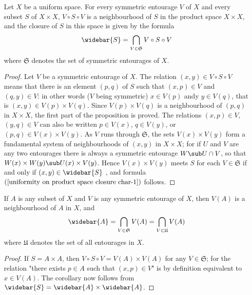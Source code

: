 \begin{proposition}\label{uniformity on product space closure char}
Let $X$ be a uniform space. For every symmetric entourage $V$ of $X$ and every subset $S$ of $X\times X$, $V\circ S\circ V$ is a neighbourhood of $S$ in the product space $X\times X$, and the closure of $S$ in this space is given by the formula
\begin{align}\label{uniformity on product space closure char-1}
\widebar{S}=\bigcap_{V\in\mathfrak{S}}V\circ S\circ V
\end{align}
where $\mathfrak{S}$ denotes the set of symmetric entourages of $X$.
\end{proposition}
\begin{proof}
Let $V$ be a symmetric entourage of $X$. The relation $(x,y)\in V\circ S\circ V$ means that there is an element $(p,q)$ of $S$ such that $(x,p)\in V$ and $(q,y)\in V$: in other words ($V$ being symmetric) $x\in V(p)$ andy $y\in V(q)$, that is $(x,y)\in V(p)\times V(q)$. Since $V(p)\times V(q)$ is a neighbourhood of $(p,q)$ in $X\times X$, the first part of the proposition is proved. The relations $(x,p)\in V$, $(y,q)\in V$ can also be written $p\in V(x)$, $q\in V(y)$, or $(p,q)\in V(x)\times V(y)$. As $V$ runs through $\mathfrak{S}$, the sets $V(x)\times V(y)$ form a fundamental system of neighbourhoods of $(x,y)$ in $X\times X$; for if $U$ and $V$ are any two entourages there is always a symmetric entourage $W\sub U\cap V$, so that $W(x)\times W(y)\sub U(x)\times V(y)$. Hence $V(x)\times V(y)$ meets $S$ for each $V\in\mathfrak{S}$ if and only if $(x,y)\in\widebar{S}$ , and formula $(\ref{uniformity on product space closure char-1})$ follows.
\end{proof}
\begin{corollary}\label{uniformity topology closure char}
If $A$ is any subset of $X$ and $V$ is any symmetric entourage of $X$, then $V(A)$ is a neighbourhood of $A$ in $X$, and
\begin{align}\label{uniformity topology closure char-1}
\widebar{A}=\bigcap_{V\in\mathfrak{S}}V(A)=\bigcap_{V\in\mathfrak{U}}V(A)
\end{align}
where $\mathfrak{U}$ denotes the set of all entourages in $X$.
\end{corollary}
\begin{proof}
If $S=A\times A$, then $V\circ S\circ V=V(A)\times V(A)$ for any $V\in\mathfrak{S}$; for the relation "there exists $p\in A$ such that $(x,p)\in V$" is by definition equivalent to $x\in V(A)$. The corollary now follows from $\widebar{S}=\widebar{A}\times\widebar{A}$.
\end{proof}
